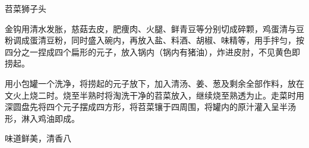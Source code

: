 \begin{recipe}{苕菜狮子头}

\ingredients



\cooking

\step 金钩用清水发胀，慈菇去皮，肥痩肉、火腿、鲜青豆等分别切成碎颗，鸡蛋清与豆粉调成蛋清豆粉，同时盛入碗内，再放入盐、料酒、胡椒、味精等，用手拌匀，按四分之一捏成四个扁形的元子，放入锅内（锅内有猪油），炸进皮肘，不见黄色即捞起。

\step 用小包罐一个洗净，将捞起的元子放下，加入清汤、姜、葱及剩余全部作料，放在文火上烧二时。烧至半熟时将淘洗干净的苕菜放入，继续烧至熟透为止。走菜时用深圆盘先将四个元子摆成四方形，将苕菜镶于四周围，将罐内的原汁灌入呈半汤形，淋入鸡油即成。

\notes

味道鲜美，清香八

\end{recipe}

